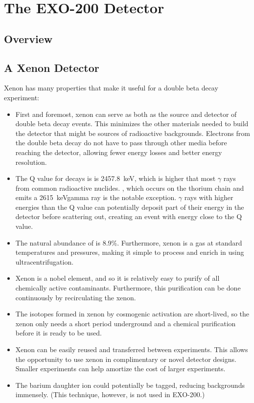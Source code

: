 \documentclass[herrin-thesis.tex]{subfiles}
\begin{document}
\chapter{The EXO-200 Detector}
\label{ch:detector}

\section{Overview}


\section{A Xenon Detector}
Xenon has many properties that make it useful for a double beta decay experiment:
\begin{itemize}
\item First and foremost, xenon can serve as both as the source and detector of double beta decay events. This minimizes the other materials needed to build the detector that might be sources of radioactive backgrounds. Electrons from the double beta decay do not have to pass through other media before reaching the detector, allowing fewer energy losses and better energy resolution.
\item The Q value for  decays is is \SI{2457.8}{\keV}\cite{Redshaw:2007cr}, which is higher that most \(\gamma\) rays from common radioactive nuclides. , which occurs on the thorium chain and emits a \SI{2615}{\keV}gamma ray is the notable exception. \(\gamma\) rays with higher energies than the Q value can potentially deposit part of their energy in the detector before scattering out, creating an event with energy close to the Q value.
\item The natural abundance of  is 8.9\%. Furthermore, xenon is a gas at standard temperatures and pressures, making it simple to process and enrich in  using ultracentrifugation.
\item Xenon is a nobel element, and so it is relatively easy to purify of all chemically active contaminants. Furthermore, this purification can be done continuously by recirculating the xenon.
\item The isotopes formed in xenon by cosmogenic activation are short-lived, so the xenon only needs a short period underground and a chemical purification before it is ready to be used.
\item Xenon can be easily reused and transferred between experiments. This allows the opportunity to use xenon in complimentary or novel detector designs. Smaller experiments can help amortize the cost of larger experiments.
\item The barium daughter ion could potentially be tagged, reducing backgrounds immensely. (This technique, however, is not used in EXO-200.)
\end{itemize}
\end{document}
